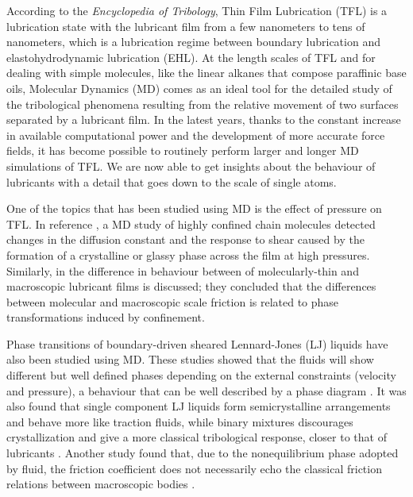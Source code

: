 \documentclass[aps,prb,reprint,superscriptaddress, a4paper]{revtex4-1}
\begin{document}
According to the \textit{Encyclopedia of Tribology}\cite{Wang2013a}, Thin Film Lubrication (TFL) is a lubrication state with the lubricant film from a few nanometers to tens of nanometers, which is a lubrication regime between boundary lubrication and elastohydrodynamic lubrication (EHL). At the length scales of TFL and for dealing with simple molecules, like the linear alkanes that compose paraffinic base oils, Molecular Dynamics (MD) comes as an ideal tool for the detailed study of the tribological phenomena resulting from  the relative movement of two surfaces separated by a lubricant film. In the latest years, thanks to the constant increase in available computational power and the development of more accurate force fields, it has become possible to routinely perform larger and longer MD simulations of TFL. We are now able to get insights about the behaviour of lubricants with a detail that goes down to the scale of single atoms. 

One of the topics that has been studied using MD is  the effect of pressure on TFL. In reference \cite{Thompson1992}, a MD study of highly confined chain molecules  detected  changes in the diffusion constant and the response to shear caused by the formation of a crystalline or glassy phase across the film at high pressures. Similarly, in \cite{Robbins1996} the difference in behaviour between of molecularly-thin and macroscopic lubricant films is discussed; they concluded that the differences between molecular and macroscopic scale friction is related to phase transformations induced by confinement.   

Phase transitions of boundary-driven sheared Lennard-Jones (LJ) liquids have also been studied using MD. These studies showed that the fluids will show different  but well defined phases depending on the external constraints (velocity and pressure), a behaviour that can be well described by a phase diagram \cite{Heyes2012}. It was also found that single component LJ liquids form semicrystalline arrangements and behave more like traction fluids, while binary mixtures discourages crystallization and give a more classical tribological response, closer to that of lubricants \cite{Gattinoni2013}. Another study found that, due to the nonequilibrium phase adopted by fluid, the friction coefficient does not necessarily echo the classical friction relations between macroscopic bodies \cite{Mackowiak2016}.
\end{document}
